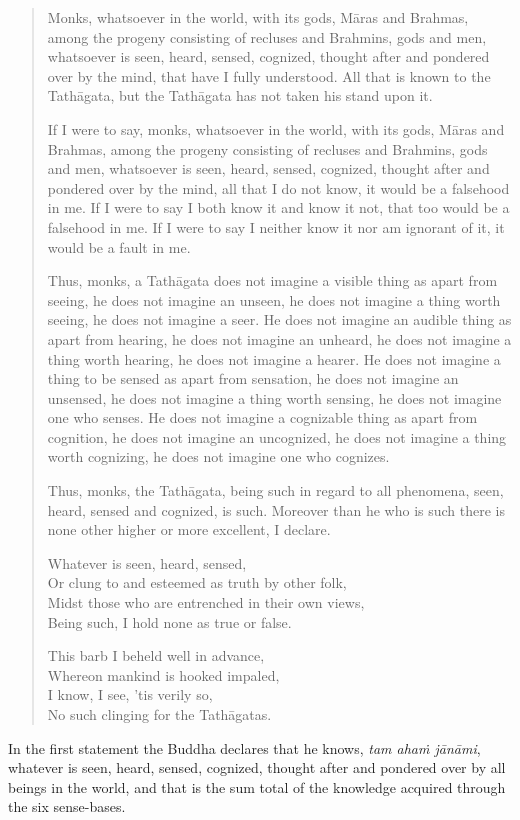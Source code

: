 \begin{quote}
Monks, whatsoever in the world, with its gods, Māras and Brahmas, among the progeny consisting of recluses and Brahmins, gods and men, whatsoever is seen, heard, sensed, cognized, thought after and pondered over by the mind, that have I fully understood. All that is known to the Tathāgata, but the Tathāgata has not taken his stand upon it.

If I were to say, monks, whatsoever in the world, with its gods, Māras and Brahmas, among the progeny consisting of recluses and Brahmins, gods and men, whatsoever is seen, heard, sensed, cognized, thought after and pondered over by the mind, all that I do not know, it would be a falsehood in me. If I were to say I both know it and know it not, that too would be a falsehood in me. If I were to say I neither know it nor am ignorant of it, it would be a fault in me.

Thus, monks, a Tathāgata does not imagine a visible thing as apart from seeing, he does not imagine an unseen, he does not imagine a thing worth seeing, he does not imagine a seer. He does not imagine an audible thing as apart from hearing, he does not imagine an unheard, he does not imagine a thing worth hearing, he does not imagine a hearer. He does not imagine a thing to be sensed as apart from sensation, he does not imagine an unsensed, he does not imagine a thing worth sensing, he does not imagine one who senses. He does not imagine a cognizable thing as apart from cognition, he does not imagine an uncognized, he does not imagine a thing worth cognizing, he does not imagine one who cognizes.

Thus, monks, the Tathāgata, being such in regard to all phenomena, seen, heard, sensed and cognized, is such. Moreover than he who is such there is none other higher or more excellent, I declare.

Whatever is seen, heard, sensed,\\
Or clung to and esteemed as truth by other folk,\\
Midst those who are entrenched in their own views,\\
Being such, I hold none as true or false.

This barb I beheld well in advance,\\
Whereon mankind is hooked impaled,\\
I know, I see, 'tis verily so,\\
No such clinging for the Tathāgatas.
\end{quote}

In the first statement the Buddha declares that he knows, \emph{tam ahaṁ jānāmi}, whatever is seen, heard, sensed, cognized, thought after and pondered over by all beings in the world, and that is the sum total of the knowledge acquired through the six sense-bases.

